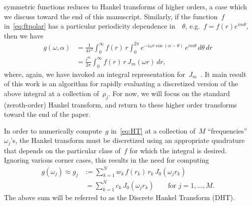 symmetric functions reduces to Hankel transforms of higher orders, a case which
we discuss toward the end of this manuscript. Similarly, if the function~$f$
in~\eqref{eq:ftpolar} has a particular periodicity dependence in~~$\theta$,
e.g.~$f = f(r)e^{im\theta}$, then we have
\begin{equation}
  \begin{aligned}
  g(\omega,\alpha) &= \frac{1}{4\pi^2} \int_0^\infty f(r) \, r \int_0^{2\pi} 
  e^{-i \omega r \cos(\alpha - \theta) } \, e^{im\theta}  \, d\theta \, dr \\
  &= \frac{i^m}{2\pi} \int_0^\infty f(r) \, r \, J_m(\omega r)  \, dr,
  \end{aligned}
\end{equation}
where, again, we have invoked an integral representation
for~$J_m$~\cite{olver2010nist}. 
It main result of this work is an algorithm for rapidly evaluating a discretized
version of the above integral at a collection of~$\rho_j$.
For now, we will focus on the standard
(zeroth-order) Hankel transform, and return to these higher order transforms
toward the end of the paper.

In order to numerically compute~$g$ in~\eqref{eq:HT} at a collection of~$M$
``frequencies''~$\omega_j$'s, the Hankel transform must be discretized using an
appropriate quadrature that depends on the particular class of~$f$ for which the
integral is desired. Ignoring various corner cases, this results in the need for
computing
\begin{equation} \label{eq:DHT}
  \begin{aligned}
  g(\omega_j) \approx 
  g_j &:= \sum_{k=1}^N w_k \, f(r_k) \, r_k \, J_0(\omega_j r_k) \\
  &\ = \sum_{k=1}^N c_k \, J_0(\omega_j r_k)
   \qquad \text{for } j = 1, \ldots, M.
  \end{aligned}
\end{equation}
The above sum will be referred to as the Discrete Hankel Transform (DHT). 

